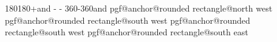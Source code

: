 {{{							\advance\pgf@x\xradius\relax%
						}%
						{180}{180+\halfarcangle}{\xradius and \yradius}%
					\else%
						\ifx\leftarc\pgf@lib@shapes@roundedrectangle@concave%
							\pgfmathpointintersectionoflineandarc{\centerpoint}{\externalpoint}%
								{%
									\centerpoint%
									\pgf@xa\pgf@x%
									\pgf@ya\pgf@y%
									\pathcornernoarc%
									\pgf@x-\pgf@x%
									\advance\pgf@x\pgf@xa%
									\pgf@y\pgf@ya%
									\advance\pgf@x-\xpathradius\relax%
								}%
								{360-\halfarcangle}{360}{\xinnerradius and \yinnerradius}%
						\else%
							\pgfpointintersectionoflines{\centerpoint}{\externalpoint}%
								{\csname pgf@anchor@rounded rectangle@north west\endcsname}%
								{\csname pgf@anchor@rounded rectangle@south west\endcsname}%
						\fi%
					\fi%
				\else%
					\pgfpointintersectionoflines{\centerpoint}{\externalpoint}%
						{\csname pgf@anchor@rounded rectangle@south west\endcsname}%
						{\csname pgf@anchor@rounded rectangle@south east\endcsname}%
				\fi%
			\else%
				\ifdim\externalangle pt<\pgfmathresult pt\relax%
					\pgfpointintersectionoflines{\centerpoint}{\externalpoint}%
						{\csname pgf@anchor@rounded rectangle@south west\endcsname}%
						{\csname pgf@anchor@rounded rectangle@south east\endcsname}%
				\else%
					\ifx\rightarc\pgf@lib@shapes@roundedrectangle@convex%
						\pgfmathpointintersectionoflineandarc{\externalpoint}{\centerpoint}%
						{%
							\csname pgf@anchor@rounded rectangle@east\endcsname%
							\advance\pgf@x-\xradius\relax%
						}%
						{360-\halfarcangle}{360}{\xradius and \yradius}%
					\else%
						\ifx\rightarc\pgf@lib@shapes@roundedrectangle@concave%
							\pgfmathpointintersectionoflineandarc{\centerpoint}{\externalpoint}%
								{%
									\centerpoint%
									\pgf@xa\pgf@x%
									\pgf@ya\pgf@y%
									\pathcornernoarc%
									\advance\pgf@x\pgf@xa%
									\pgf@y\pgf@ya%
									\advance\pgf@x\xpathradius\relax%
								}%
								{180}{180+\halfarcangle}{\xinnerradius and \yinnerradius}%
						\else%
							\pgfpointintersectionoflines{\centerpoint}{\externalpoint}%
								{\csname pgf@anchor@rounded rectangle@south east\endcsname}%
								{\csname pgf@anchor@rounded rectangle@north east\endcsname}%
						\fi%
					\fi%
				\fi%
			\fi%
		\fi%
	}%
}




%

